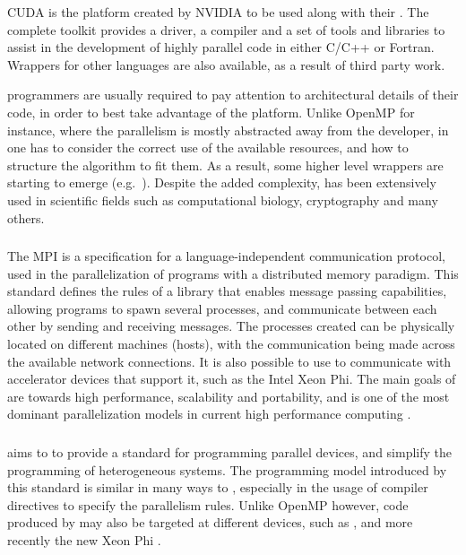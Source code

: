 \documentclass[main.tex]{subfiles}
\begin{document}
CUDA is the platform created by NVIDIA to be used along with their \gpus. The complete \cuda toolkit provides a driver, a compiler and a set of tools and libraries to assist in the development of highly parallel \gpu code in either C/C++ or Fortran. Wrappers for other languages are also available, as a result of third party work.

\cuda programmers are usually required to pay attention to architectural details of their code, in order to best take advantage of the platform. Unlike OpenMP for instance, where the parallelism is mostly abstracted away from the developer, in \cuda one has to consider the correct use of the available resources, and how to structure the algorithm to fit them. As a result, some higher level wrappers are starting to emerge (e.g.\ \openacc). Despite the added complexity, \cuda has been extensively used in scientific fields such as computational biology, cryptography and many others.



\subsubsection{\mpi}

The \acf{MPI} is a specification for a language-independent communication protocol, used in the parallelization of programs with a distributed memory paradigm. This standard defines the rules of a library that enables message passing capabilities, allowing programs to spawn several processes, and communicate between each other by sending and receiving messages. The processes created can be physically located on different machines (hosts), with the communication being made across the available network connections. It is also possible to use \mpi to communicate with accelerator devices that support it, such as the Intel Xeon Phi. The main goals of \mpi are towards high performance, scalability and portability, and is one of the most dominant parallelization models in current high performance computing \cite{sur2006high}.


\subsubsection{\openacc}
\openacc aims to to provide a standard for programming parallel devices, and simplify the programming of heterogeneous systems.
The programming model introduced by this standard is similar in many ways to \openmp, especially in the usage of compiler directives to specify the parallelism rules. Unlike \acs{OpenMP} however, code produced by \openacc may also be targeted at different devices, such as \gpus, and more recently the new \intel Xeon Phi \cite{openacc-phi2012}.
\end{document}
